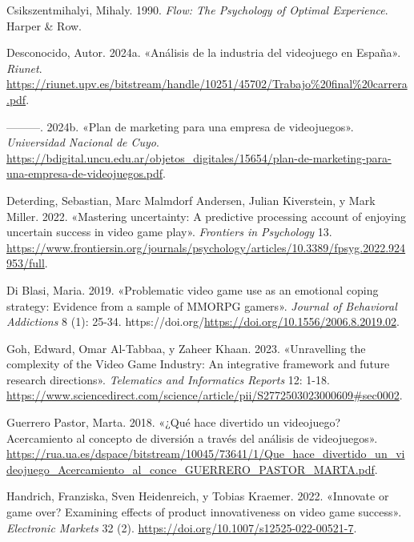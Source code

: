 \documentclass[
  letterpaper,
  DIV=11,
  numbers=noendperiod]{scrreprt}
\newlength{\cslhangindent}
\newlength{\cslentryspacingunit} %
\newenvironment{CSLReferences}[2] %
 {%
  \setlength{\parindent}{0pt}
  \ifodd #1
  \let\oldpar\par
  \def\par{\hangindent=\cslhangindent\oldpar}
  \fi
  \setlength{\parskip}{#2\cslentryspacingunit}
 }%
 {}
\begin{document}
\hypertarget{refs}{}
\begin{CSLReferences}{1}{0}
\leavevmode{}%
Csikszentmihalyi, Mihaly. 1990. \emph{Flow: The Psychology of Optimal
Experience}. Harper \& Row.

\leavevmode{}%
Desconocido, Autor. 2024a. {«Análisis de la industria del videojuego en
España»}. \emph{Riunet}.
\url{https://riunet.upv.es/bitstream/handle/10251/45702/Trabajo\%20final\%20carrera.pdf}.

\leavevmode{}%
---------. 2024b. {«Plan de marketing para una empresa de videojuegos»}.
\emph{Universidad Nacional de Cuyo}.
\url{https://bdigital.uncu.edu.ar/objetos_digitales/15654/plan-de-marketing-para-una-empresa-de-videojuegos.pdf}.

\leavevmode{}%
Deterding, Sebastian, Marc Malmdorf Andersen, Julian Kiverstein, y Mark
Miller. 2022. {«Mastering uncertainty: A predictive processing account
of enjoying uncertain success in video game play»}. \emph{Frontiers in
Psychology} 13.
\url{https://www.frontiersin.org/journals/psychology/articles/10.3389/fpsyg.2022.924953/full}.

\leavevmode{}%
Di Blasi, Maria. 2019. {«Problematic video game use as an emotional
coping strategy: Evidence from a sample of MMORPG gamers»}.
\emph{Journal of Behavioral Addictions} 8 (1): 25-34.
https://doi.org/\url{https://doi.org/10.1556/2006.8.2019.02}.

\leavevmode{}%
Goh, Edward, Omar Al-Tabbaa, y Zaheer Khaan. 2023. {«Unravelling the
complexity of the Video Game Industry: An integrative framework and
future research directions»}. \emph{Telematics and Informatics Reports}
12: 1-18.
\url{https://www.sciencedirect.com/science/article/pii/S2772503023000609\#sec0002}.

\leavevmode{}%
Guerrero Pastor, Marta. 2018. {«¿Qué hace divertido un videojuego?
Acercamiento al concepto de diversión a través del análisis de
videojuegos»}.
\url{https://rua.ua.es/dspace/bitstream/10045/73641/1/Que_hace_divertido_un_videojuego_Acercamiento_al_conce_GUERRERO_PASTOR_MARTA.pdf}.

\leavevmode{}%
Handrich, Franziska, Sven Heidenreich, y Tobias Kraemer. 2022.
{«Innovate or game over? Examining effects of product innovativeness on
video game success»}. \emph{Electronic Markets} 32 (2).
\url{https://doi.org/10.1007/s12525-022-00521-7}.


\end{CSLReferences}
\end{document}
